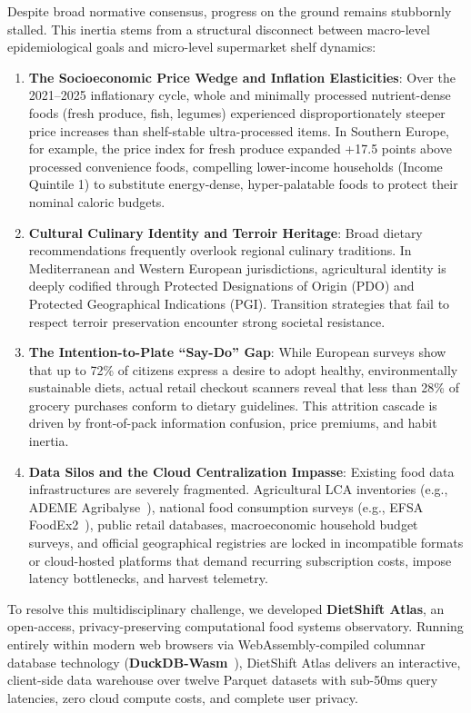 \documentclass[journal,10pt,twocolumn]{article}
\begin{document}
Despite broad normative consensus, progress on the ground remains stubbornly stalled. This inertia stems from a structural disconnect between macro-level epidemiological goals and micro-level supermarket shelf dynamics:
\begin{enumerate}
    \item \textbf{The Socioeconomic Price Wedge and Inflation Elasticities}: Over the 2021--2025 inflationary cycle, whole and minimally processed nutrient-dense foods (fresh produce, fish, legumes) experienced disproportionately steeper price increases than shelf-stable ultra-processed items. In Southern Europe, for example, the price index for fresh produce expanded +17.5 points above processed convenience foods, compelling lower-income households (Income Quintile 1) to substitute energy-dense, hyper-palatable foods to protect their nominal caloric budgets.
    \item \textbf{Cultural Culinary Identity and Terroir Heritage}: Broad dietary recommendations frequently overlook regional culinary traditions. In Mediterranean and Western European jurisdictions, agricultural identity is deeply codified through Protected Designations of Origin (PDO) and Protected Geographical Indications (PGI). Transition strategies that fail to respect terroir preservation encounter strong societal resistance.
    \item \textbf{The Intention-to-Plate ``Say-Do'' Gap}: While European surveys show that up to 72\% of citizens express a desire to adopt healthy, environmentally sustainable diets, actual retail checkout scanners reveal that less than 28\% of grocery purchases conform to dietary guidelines. This attrition cascade is driven by front-of-pack information confusion, price premiums, and habit inertia.
    \item \textbf{Data Silos and the Cloud Centralization Impasse}: Existing food data infrastructures are severely fragmented. Agricultural LCA inventories (e.g., ADEME Agribalyse~\cite{ademe2023agribalyse}), national food consumption surveys (e.g., EFSA FoodEx2~\cite{efsa2011comprehensive}), public retail databases, macroeconomic household budget surveys, and official geographical registries are locked in incompatible formats or cloud-hosted platforms that demand recurring subscription costs, impose latency bottlenecks, and harvest telemetry.
\end{enumerate}

To resolve this multidisciplinary challenge, we developed \textbf{DietShift Atlas}, an open-access, privacy-preserving computational food systems observatory. Running entirely within modern web browsers via WebAssembly-compiled columnar database technology (\textbf{DuckDB-Wasm}~\cite{raasveldt2024wasm}), DietShift Atlas delivers an interactive, client-side data warehouse over twelve Parquet datasets with sub-50ms query latencies, zero cloud compute costs, and complete user privacy.
\end{document}
